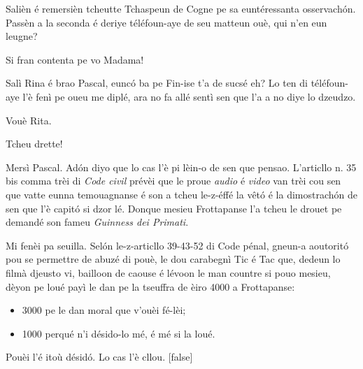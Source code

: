 \begin{drama}
\Ritaspeaks Salièn é remersièn tcheutte Tchaspeun de Cogne pe sa euntéressanta osservachón. Passèn a la seconda é deriye téléfoun-aye de seu matteun ouè, qui n’en eun leugne?


\Ritaspeaks Si fran contenta pe vo Madama!


\Ritaspeaks Salì Rina é brao Pascal, eunc\'o ba pe Fin-ise t’a de sucsé eh? Lo ten di téléfoun-aye l’è fenì pe oueu me diplé, ara no fa allé sentì sen que l’a a no diye lo dzeudzo.

\Pascalspeaks Vouè Rita.



\Pascalspeaks Tcheu drette!


\DzeudzoSenliquerspeaks Mersì Pascal. Adón diyo que lo cas l'è pi lèin-o de sen que pensao. L'articllo n. 35 bis comma trèi di \textit{Code civil} prévèi que le proue \textit{audio} é \textit{video} van trèi cou sen que vatte eunna temouagnanse é son a tcheu le-z-éffé la v\^etó é la dimostrachón de sen que l’è capitó si dzor lé. Donque mesieu Frottapanse l'a tcheu le drouet pe demandé son fameu \textit{Guinness dei Primati}.


\DzeudzoSenliquerspeaks Mi fenèi pa seuilla. Selón le-z-articllo 39-43-52 di Code pénal, gneun-a aoutoritó pou se permettre de abuzé di pouè, le dou carabegnì Tic é Tac que, dedeun lo filmà djeusto vi, bailloon de caouse é lévoon le man countre si pouo mesieu, dèyon pe loué payì le dan pe la tseuffra de èiro 4000 a Frottapanse: 
\begin{itemize}
\item[$\bullet$] 3000 pe le dan moral que v'ouèi fé-lèi;
\item[$\bullet$] 1000 perqué n’i désido-lo mé, é mé si la loué.
\end{itemize}
Pouèi l'é itoù désidó. Lo cas l'è cllou.
\newpage
{}[false]


\end{drama}
